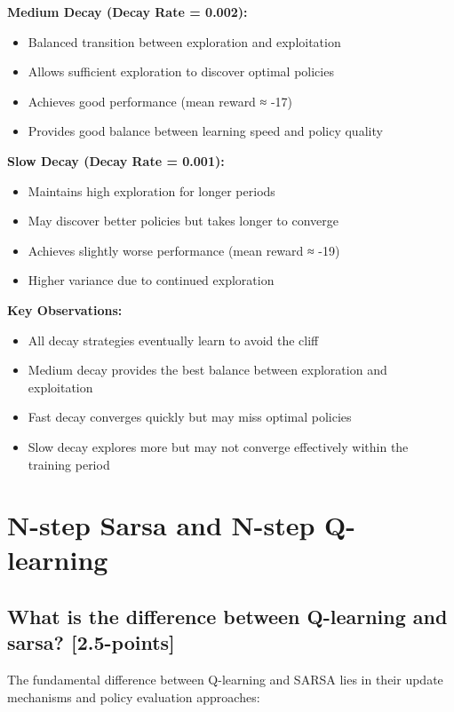 \documentclass[12pt]{article}
\begin{document}
{{{\textbf{Medium Decay (Decay Rate = 0.002):}
\begin{itemize}
    \item Balanced transition between exploration and exploitation
    \item Allows sufficient exploration to discover optimal policies
    \item Achieves good performance (mean reward ≈ -17)
    \item Provides good balance between learning speed and policy quality
\end{itemize}

\textbf{Slow Decay (Decay Rate = 0.001):}
\begin{itemize}
    \item Maintains high exploration for longer periods
    \item May discover better policies but takes longer to converge
    \item Achieves slightly worse performance (mean reward ≈ -19)
    \item Higher variance due to continued exploration
\end{itemize}

\textbf{Key Observations:}
\begin{itemize}
    \item All decay strategies eventually learn to avoid the cliff
    \item Medium decay provides the best balance between exploration and exploitation
    \item Fast decay converges quickly but may miss optimal policies
    \item Slow decay explores more but may not converge effectively within the training period
\end{itemize}

\section{N-step Sarsa and N-step Q-learning}
\subsection{What is the difference between Q-learning and sarsa? [2.5-points]}

The fundamental difference between Q-learning and SARSA lies in their update mechanisms and policy evaluation approaches:

}}}
\end{document}
